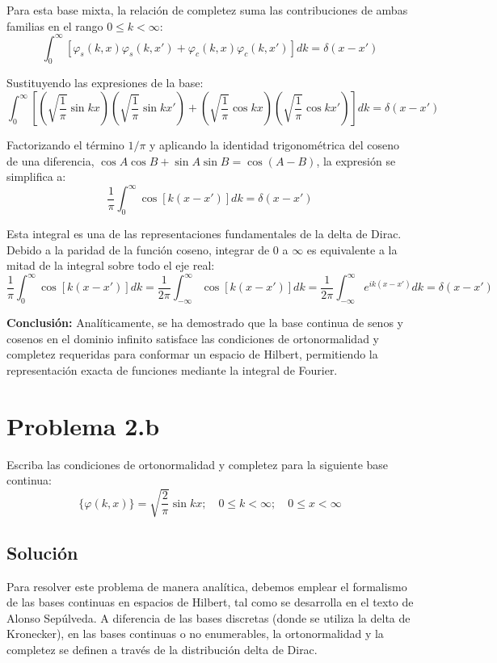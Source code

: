\documentclass[a4paper]{article}
\begin{document}
Para esta base mixta, la relación de completez suma las contribuciones de ambas familias en el rango $0 \leq k < \infty$:
$$ \int_{0}^{\infty} \left[ \varphi_s(k, x) \varphi_s(k, x') + \varphi_c(k, x) \varphi_c(k, x') \right] dk = \delta(x - x') $$

Sustituyendo las expresiones de la base:
$$ \int_{0}^{\infty} \left[ \left( \sqrt{\frac{1}{\pi}} \sin kx \right) \left( \sqrt{\frac{1}{\pi}} \sin kx' \right) + \left( \sqrt{\frac{1}{\pi}} \cos kx \right) \left( \sqrt{\frac{1}{\pi}} \cos kx' \right) \right] dk = \delta(x - x') $$

Factorizando el término $1/\pi$ y aplicando la identidad trigonométrica del coseno de una diferencia, $\cos A \cos B + \sin A \sin B = \cos(A - B)$, la expresión se simplifica a:
$$ \frac{1}{\pi} \int_{0}^{\infty} \cos[k(x - x')] dk = \delta(x - x') $$

Esta integral es una de las representaciones fundamentales de la delta de Dirac. Debido a la paridad de la función coseno, integrar de $0$ a $\infty$ es equivalente a la mitad de la integral sobre todo el eje real:
$$ \frac{1}{\pi} \int_{0}^{\infty} \cos[k(x - x')] dk = \frac{1}{2\pi} \int_{-\infty}^{\infty} \cos[k(x - x')] dk = \frac{1}{2\pi} \int_{-\infty}^{\infty} e^{ik(x - x')} dk = \delta(x - x') $$

\textbf{Conclusión:} Analíticamente, se ha demostrado que la base continua de senos y cosenos en el dominio infinito satisface las condiciones de ortonormalidad y completez requeridas para conformar un espacio de Hilbert, permitiendo la representación exacta de funciones mediante la integral de Fourier.


\section{Problema 2.b}
Escriba las condiciones de ortonormalidad y completez para la siguiente base continua:
$$ \{ \varphi(k, x) \} = \sqrt{\frac{2}{\pi}} \sin kx ; \quad 0 \leq k < \infty; \quad 0 \leq x < \infty $$

\subsection{Solución}

Para resolver este problema de manera analítica, debemos emplear el formalismo de las bases continuas en espacios de Hilbert, tal como se desarrolla en el texto de Alonso Sepúlveda. A diferencia de las bases discretas (donde se utiliza la delta de Kronecker), en las bases continuas o no enumerables, la ortonormalidad y la completez se definen a través de la distribución delta de Dirac.
\end{document}
